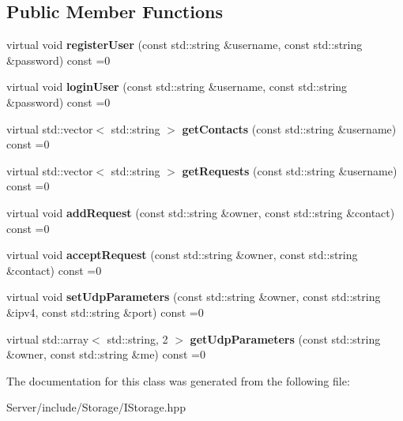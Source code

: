 \subsection*{Public Member Functions}
\begin{DoxyCompactItemize}
\item 
\mbox{\label{classbbl_1_1srv_1_1_i_storage_ae573fbede5dc6e839878d105d5ed9c7f}} 
virtual void {\bfseries register\+User} (const std\+::string \&username, const std\+::string \&password) const =0
\item 
\mbox{\label{classbbl_1_1srv_1_1_i_storage_a25f5dd59922a95e81cce022af1446f55}} 
virtual void {\bfseries login\+User} (const std\+::string \&username, const std\+::string \&password) const =0
\item 
\mbox{\label{classbbl_1_1srv_1_1_i_storage_afdca8afce2681f2a6a7388962bb578f9}} 
virtual std\+::vector$<$ std\+::string $>$ {\bfseries get\+Contacts} (const std\+::string \&username) const =0
\item 
\mbox{\label{classbbl_1_1srv_1_1_i_storage_a2e3541635272914292fe5e70dd5d071b}} 
virtual std\+::vector$<$ std\+::string $>$ {\bfseries get\+Requests} (const std\+::string \&username) const =0
\item 
\mbox{\label{classbbl_1_1srv_1_1_i_storage_aff2a9b83a9076eba98b837821d8593ab}} 
virtual void {\bfseries add\+Request} (const std\+::string \&owner, const std\+::string \&contact) const =0
\item 
\mbox{\label{classbbl_1_1srv_1_1_i_storage_a2ff99f698e40d39a298746d53602e990}} 
virtual void {\bfseries accept\+Request} (const std\+::string \&owner, const std\+::string \&contact) const =0
\item 
\mbox{\label{classbbl_1_1srv_1_1_i_storage_ac1d86f612146cfc3188fa06b4ea767ea}} 
virtual void {\bfseries set\+Udp\+Parameters} (const std\+::string \&owner, const std\+::string \&ipv4, const std\+::string \&port) const =0
\item 
\mbox{\label{classbbl_1_1srv_1_1_i_storage_acc8ca98c6bb8059c5bfeef056e5a146b}} 
virtual std\+::array$<$ std\+::string, 2 $>$ {\bfseries get\+Udp\+Parameters} (const std\+::string \&owner, const std\+::string \&me) const =0
\end{DoxyCompactItemize}


The documentation for this class was generated from the following file\+:\begin{DoxyCompactItemize}
\item 
Server/include/\+Storage/I\+Storage.\+hpp\end{DoxyCompactItemize}
